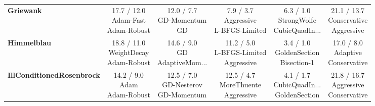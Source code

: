 \documentclass[10pt]{article}
\begin{document}
\begin{longtable}{lccccc}
\textbf{Griewank} &  \makecell{17.7 / 12.0 \\ \scriptsize{Adam-Fast} \\ \scriptsize{Adam-Robust}}&  \makecell{12.0 / 7.7 \\ \scriptsize{GD-Momentum} \\ \scriptsize{GD}}&  \makecell{7.9 / 3.7 \\ \scriptsize{Aggressive} \\ \scriptsize{L-BFGS-Limited}}& \cellcolor{green!20} \makecell{6.3 / 1.0 \\ \scriptsize{StrongWolfe} \\ \scriptsize{CubicQuadIn...}}& \cellcolor{red!15} \makecell{21.1 / 13.7 \\ \scriptsize{Conservative} \\ \scriptsize{Aggressive}} \\
\textbf{Himmelblau} & \cellcolor{red!15} \makecell{18.8 / 11.0 \\ \scriptsize{WeightDecay} \\ \scriptsize{Adam-Robust}}&  \makecell{14.6 / 9.0 \\ \scriptsize{GD} \\ \scriptsize{AdaptiveMom...}}&  \makecell{11.2 / 5.0 \\ \scriptsize{L-BFGS-Limited} \\ \scriptsize{Aggressive}}& \cellcolor{green!20} \makecell{3.4 / 1.0 \\ \scriptsize{GoldenSection} \\ \scriptsize{Bisection-1}}&  \makecell{17.0 / 8.0 \\ \scriptsize{Adaptive} \\ \scriptsize{Conservative}} \\
\textbf{IllConditionedRosenbrock} &  \makecell{14.2 / 9.0 \\ \scriptsize{Adam} \\ \scriptsize{Adam-Robust}}&  \makecell{12.5 / 7.0 \\ \scriptsize{GD-Nesterov} \\ \scriptsize{GD-Momentum}}&  \makecell{12.5 / 4.7 \\ \scriptsize{MoreThuente} \\ \scriptsize{Aggressive}}& \cellcolor{green!20} \makecell{4.1 / 1.7 \\ \scriptsize{CubicQuadIn...} \\ \scriptsize{GoldenSection}}& \cellcolor{red!15} \makecell{21.8 / 16.7 \\ \scriptsize{Aggressive} \\ \scriptsize{Conservative}} \\

\end{longtable}
\end{document}
